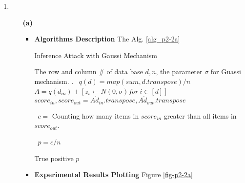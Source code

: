 \documentclass[11pt]{article}
\begin{document}
\begin{enumerate}
\item
\begin{enumerate}
	\item[\textbf{(a)}]
	\begin{itemize}
		\item \textbf{Algorithms Description}
		The Alg. \ref{alg_p2-2a}
		\begin{algorithm}
		\caption{Inference Attack with Gaussi Mechanism}
		\label{alg_p2-2a}
		\begin{algorithmic}
		\REQUIRE The row and column \# of data base $d, n$, the parameter $\sigma$ for Guassi mechanism.
		. 
		\ $q(d) = map(sum, d.transpose)/n$
		\ $A = q(d_{in}) + [z_i \leftarrow N(0, \sigma) for\ i \in [d]]$
		\ 
		$score_{in}, score_{out} = A \dot d_{in}.transpose, A \dot d_{out}.transpose$

		\STATE	{}
		
		\ 
		$c = $ Counting how many items in $score_{in}$ greater than all items in $score_{out}$.
		
		\STATE {\bf let}\  $p = c / n$

		\RETURN True positive $p$
		\end{algorithmic}
		\end{algorithm}
		\item \textbf{Experimental Results Plotting}
		Figure \ref{fig-p2-2a}


\end{itemize}
\end{enumerate}
\end{enumerate}
\end{document}
